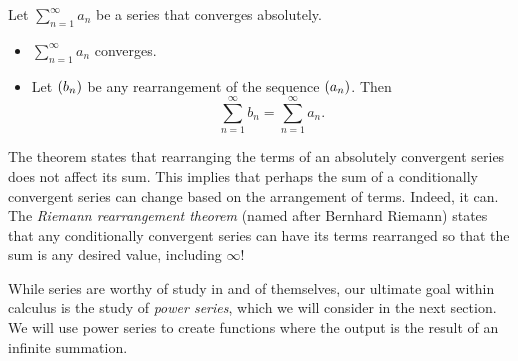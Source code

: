 \documentclass{ximera}
\begin{document}
\begin{theorem}
  Let $\sum_{n=1}^\infty a_n$ be a series that converges absolutely.
\begin{itemize}
\item $\sum_{n=1}^\infty a_n$ converges.  
\item Let $\left( b_n \right)$ be any rearrangement of the sequence
  $\left( a_n \right)$. Then
	  \[
          \sum_{n=1}^\infty b_n = \sum_{n=1}^\infty a_n.
          \]
\end{itemize}
\end{theorem}

The theorem states that rearranging the terms of an absolutely
convergent series does not affect its sum. This implies that perhaps
the sum of a conditionally convergent series can change based on the
arrangement of terms. Indeed, it can. The \textit{Riemann
  rearrangement theorem} (named after Bernhard Riemann) states that
any conditionally convergent series can have its terms rearranged so
that the sum is any desired value, including $\infty$!


While series are worthy of study in and of themselves, our ultimate
goal within calculus is the study of \textit{power series}, which we
will consider in the next section. We will use power series to create
functions where the output is the result of an infinite summation.

\end{document}
